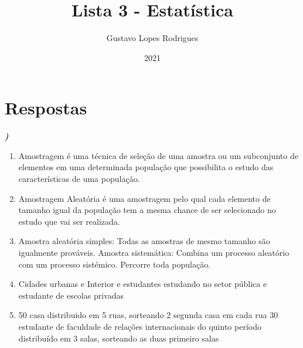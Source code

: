 \documentclass[12pt]{article}
\title{\textbf{Lista 3 - Estatística}}
\author{Gustavo Lopes Rodrigues}
\date{2021}
\newcounter{instn}
\newcommand{\instnum}{\arabic{instn}}
\newcommand{\myline}[1]{
    \emph{\textbf{#1)}}
    \addtocounter{instn}{1}
}
\newenvironment{question}
 {
    \myline{\instnum} 
    }
    {
 }
\begin{document}
    
    \maketitle

    \section*{Respostas}


    \begin{question}
       
        \begin{enumerate}[label={\textbf{\alph*)}}]

            \item 
            
            Amostragem é uma técnica de seleção de uma amostra ou um subconjunto de elementos em uma determinada
            população que possibilita o estudo das características de uma população.
            \item 
            
            Amostragem Aleatória é uma amostragem pelo qual cada elemento de tamanho igual da
            população tem a mesma chance de ser selecionado no estudo que vai ser realizada.
            \item 
            
            Amostra aleatória simples: Todas as amostras de mesmo tamanho são igualmente prováveis.
            Amostra sistemática: Combina um processo aleatório com um processo sistémico. Percorre toda população.
            \item 
            
            Cidades urbanas e Interior e estudantes estudando no setor pública e estudante de escolas privadas
            \item 
            
            50 casa distribuido em 5 ruas, sorteando 2 segunda casa em cada rua
            30 estudante de faculdade de relações internacionais do quinto período distribuído em 3 salas, sorteando as duas
            primeiro salas

        \end{enumerate}
    \end{question}

\end{document}
